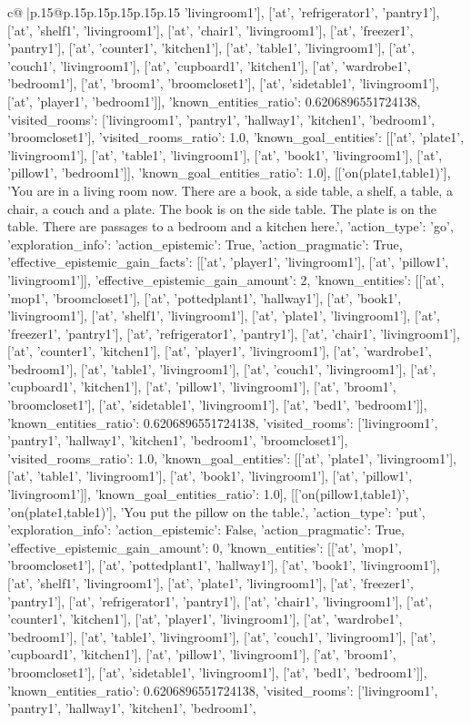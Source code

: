 \documentclass{article}
\begin{document}
{\begin{supertabular}{c@{$\;$}|p{.15\linewidth}@{}p{.15\linewidth}p{.15\linewidth}p{.15\linewidth}p{.15\linewidth}p{.15\linewidth}}
{{{'livingroom1'], ['at', 'refrigerator1', 'pantry1'], ['at', 'shelf1', 'livingroom1'], ['at', 'chair1', 'livingroom1'], ['at', 'freezer1', 'pantry1'], ['at', 'counter1', 'kitchen1'], ['at', 'table1', 'livingroom1'], ['at', 'couch1', 'livingroom1'], ['at', 'cupboard1', 'kitchen1'], ['at', 'wardrobe1', 'bedroom1'], ['at', 'broom1', 'broomcloset1'], ['at', 'sidetable1', 'livingroom1'], ['at', 'player1', 'bedroom1']], 'known_entities_ratio': 0.6206896551724138, 'visited_rooms': ['livingroom1', 'pantry1', 'hallway1', 'kitchen1', 'bedroom1', 'broomcloset1'], 'visited_rooms_ratio': 1.0, 'known_goal_entities': [['at', 'plate1', 'livingroom1'], ['at', 'table1', 'livingroom1'], ['at', 'book1', 'livingroom1'], ['at', 'pillow1', 'bedroom1']], 'known_goal_entities_ratio': 1.0}}], [['on(plate1,table1)'], 'You are in a living room now. There are a book, a side table, a shelf, a table, a chair, a couch and a plate. The book is on the side table. The plate is on the table. There are passages to a bedroom and a kitchen here.', {'action_type': 'go', 'exploration_info': {'action_epistemic': True, 'action_pragmatic': True, 'effective_epistemic_gain_facts': [['at', 'player1', 'livingroom1'], ['at', 'pillow1', 'livingroom1']], 'effective_epistemic_gain_amount': 2, 'known_entities': [['at', 'mop1', 'broomcloset1'], ['at', 'pottedplant1', 'hallway1'], ['at', 'book1', 'livingroom1'], ['at', 'shelf1', 'livingroom1'], ['at', 'plate1', 'livingroom1'], ['at', 'freezer1', 'pantry1'], ['at', 'refrigerator1', 'pantry1'], ['at', 'chair1', 'livingroom1'], ['at', 'counter1', 'kitchen1'], ['at', 'player1', 'livingroom1'], ['at', 'wardrobe1', 'bedroom1'], ['at', 'table1', 'livingroom1'], ['at', 'couch1', 'livingroom1'], ['at', 'cupboard1', 'kitchen1'], ['at', 'pillow1', 'livingroom1'], ['at', 'broom1', 'broomcloset1'], ['at', 'sidetable1', 'livingroom1'], ['at', 'bed1', 'bedroom1']], 'known_entities_ratio': 0.6206896551724138, 'visited_rooms': ['livingroom1', 'pantry1', 'hallway1', 'kitchen1', 'bedroom1', 'broomcloset1'], 'visited_rooms_ratio': 1.0, 'known_goal_entities': [['at', 'plate1', 'livingroom1'], ['at', 'table1', 'livingroom1'], ['at', 'book1', 'livingroom1'], ['at', 'pillow1', 'livingroom1']], 'known_goal_entities_ratio': 1.0}}], [['on(pillow1,table1)', 'on(plate1,table1)'], 'You put the pillow on the table.', {'action_type': 'put', 'exploration_info': {'action_epistemic': False, 'action_pragmatic': True, 'effective_epistemic_gain_amount': 0, 'known_entities': [['at', 'mop1', 'broomcloset1'], ['at', 'pottedplant1', 'hallway1'], ['at', 'book1', 'livingroom1'], ['at', 'shelf1', 'livingroom1'], ['at', 'plate1', 'livingroom1'], ['at', 'freezer1', 'pantry1'], ['at', 'refrigerator1', 'pantry1'], ['at', 'chair1', 'livingroom1'], ['at', 'counter1', 'kitchen1'], ['at', 'player1', 'livingroom1'], ['at', 'wardrobe1', 'bedroom1'], ['at', 'table1', 'livingroom1'], ['at', 'couch1', 'livingroom1'], ['at', 'cupboard1', 'kitchen1'], ['at', 'pillow1', 'livingroom1'], ['at', 'broom1', 'broomcloset1'], ['at', 'sidetable1', 'livingroom1'], ['at', 'bed1', 'bedroom1']], 'known_entities_ratio': 0.6206896551724138, 'visited_rooms': ['livingroom1', 'pantry1', 'hallway1', 'kitchen1', 'bedroom1', }}}
\end{supertabular}}
\end{document}
